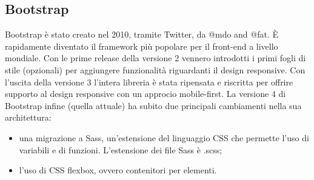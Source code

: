 \subsection{Bootstrap}
\noindent Bootstrap è stato creato nel 2010, tramite Twitter, da @mdo and @fat.\newline
È rapidamente diventato il framework più popolare per il front-end a livello mondiale.
Con le prime release della versione 2 vennero introdotti i primi fogli di stile (opzionali) per aggiungere funzionalità riguardanti il design responsive.\newline
Con l'uscita della versione 3 l'intera libreria è stata ripensata e riscritta per offrire supporto al design responsive con un approcio mobile-first.
La versione 4 di Bootstrap infine (quella attuale) ha subito due principali cambiamenti nella sua architettura:
\begin{itemize}
    \item una migrazione a Sass, un'estensione del linguaggio CSS che permette l'uso di variabili e di funzioni. L'estensione dei file Sass è .scss;
    \item l'uso di CSS flexbox, ovvero contenitori per elementi.
\end{itemize}

